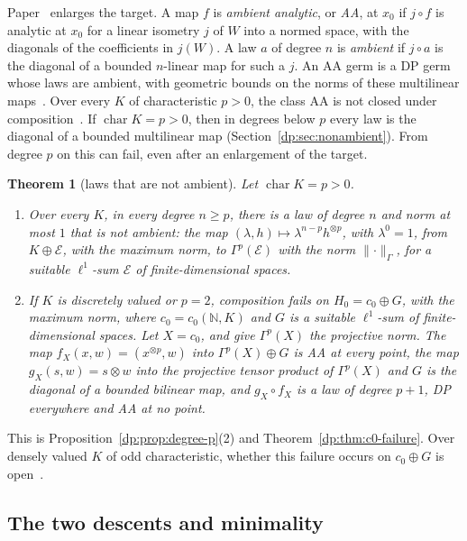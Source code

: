 \documentclass[11pt]{amsart}
\theoremstyle{definition}
\theoremstyle{remark}
\numberwithin{equation}{section}
\newcommand{\N}{\mathbb N}
\newcommand{\norm}[1]{\lVert #1\rVert}
\theoremstyle{plain}
\newtheorem{introtheorem}{Theorem}
\theoremstyle{definition}
\theoremstyle{plain}
\begin{document}
Paper~\cite{I} enlarges the target. A map $f$ is \emph{ambient analytic}, or \emph{AA}, at $x_0$ if $j\circ f$ is analytic at $x_0$ for a linear isometry $j$ of $W$ into a normed space, with the diagonals of the coefficients in $j(W)$. A law $a$ of degree $n$ is \emph{ambient} if $j\circ a$ is the diagonal of a bounded $n$-linear map for such a $j$. An AA germ is a DP germ whose laws are ambient, with geometric bounds on the norms of these multilinear maps~\cite[Proposition~14.9]{I}. Over every $K$ of characteristic $p>0$, the class AA is not closed under composition~\cite[Theorem~14.17]{I}. If $\operatorname{char}K=p>0$, then in degrees below $p$ every law is the diagonal of a bounded multilinear map (Section~\ref{dp:sec:nonambient}). From degree $p$ on this can fail, even after an enlargement of the target.

\begin{introtheorem}[laws that are not ambient]\label{dp:intro:A}
Let $\operatorname{char}K=p>0$.
\begin{enumerate}
\item Over every $K$, in every degree $n\ge p$, there is a law of degree $n$ and norm at most $1$ that is not ambient: the map $(\lambda,h)\mapsto\lambda^{n-p}h^{\otimes p}$, with $\lambda^0=1$, from $K\oplus\mathcal E$, with the maximum norm, to $\Gamma^p(\mathcal E)$ with the norm $\norm\cdot_\Gamma$, for a suitable $\ell^1$-sum $\mathcal E$ of finite-dimensional spaces.
\item If $K$ is discretely valued or $p=2$, composition fails on $H_0=c_0\oplus G$, with the maximum norm, where $c_0=c_0(\N,K)$ and $G$ is a suitable $\ell^1$-sum of finite-dimensional spaces. Let $X=c_0$, and give $\Gamma^p(X)$ the projective norm. The map $f_X(x,w)=(x^{\otimes p},w)$ into $\Gamma^p(X)\oplus G$ is AA at every point, the map $g_X(s,w)=s\otimes w$ into the projective tensor product of $\Gamma^p(X)$ and $G$ is the diagonal of a bounded bilinear map, and $g_X\circ f_X$ is a law of degree $p+1$, DP everywhere and AA at no point.
\end{enumerate}
\end{introtheorem}

This is Proposition~\ref{dp:prop:degree-p}(2) and Theorem~\ref{dp:thm:c0-failure}. Over densely valued $K$ of odd characteristic, whether this failure occurs on $c_0\oplus G$ is open~\cite[Remark~14.20]{I}.

\subsection*{The two descents and minimality}
\end{document}
